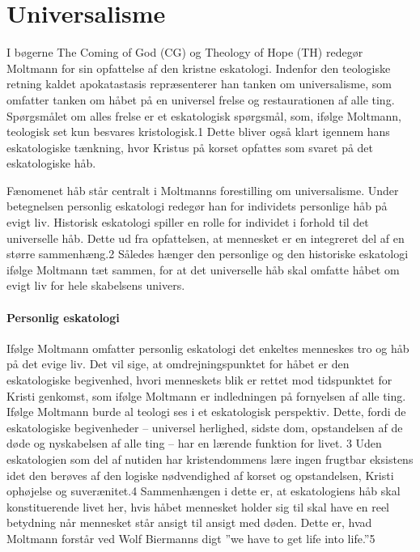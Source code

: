\chapter{Universalisme}
I bøgerne The Coming of God (CG) og Theology of Hope (TH) redegør Moltmann for sin opfattelse af den kristne eskatologi. Indenfor den teologiske retning kaldet apokatastasis repræsenterer han tanken om universalisme, som omfatter tanken om håbet på en universel frelse og restaurationen af alle ting. Spørgsmålet om alles frelse er et eskatologisk spørgsmål, som, ifølge Moltmann, teologisk set kun besvares kristologisk.1 Dette bliver også klart igennem hans eskatologiske tænkning, hvor Kristus på korset opfattes som svaret på det eskatologiske håb.

Fænomenet håb står centralt i Moltmanns forestilling om universalisme. Under betegnelsen personlig eskatologi redegør han for individets personlige håb på evigt liv. Historisk eskatologi spiller en rolle for individet i forhold til det universelle håb. Dette ud fra opfattelsen, at mennesket er en integreret del af en større sammenhæng.2 Således hænger den personlige og den historiske eskatologi ifølge Moltmann tæt sammen, for at det universelle håb skal omfatte håbet om evigt liv for hele skabelsens univers.  

\subsubsection{Personlig eskatologi}
Ifølge Moltmann omfatter personlig eskatologi det enkeltes menneskes tro og håb på det evige liv. Det vil sige, at omdrejningspunktet for håbet er den eskatologiske begivenhed, hvori menneskets blik er rettet mod tidspunktet for Kristi genkomst, som ifølge Moltmann er indledningen på fornyelsen af alle ting. Ifølge Moltmann burde al teologi ses i et eskatologisk perspektiv. Dette, fordi de eskatologiske begivenheder – universel herlighed, sidste dom, opstandelsen af de døde og nyskabelsen af alle ting – har en lærende funktion for livet. 3 Uden eskatologien som del af nutiden har kristendommens lære ingen frugtbar eksistens idet den berøves af den logiske nødvendighed af korset og opstandelsen, Kristi ophøjelse og suverænitet.4 Sammenhængen i dette er, at eskatologiens håb skal konstituerende livet her, hvis håbet mennesket holder sig til skal have en reel betydning når mennesket står ansigt til ansigt med døden. Dette er, hvad Moltmann forstår ved Wolf Biermanns digt ”we have to get life into life.”5

